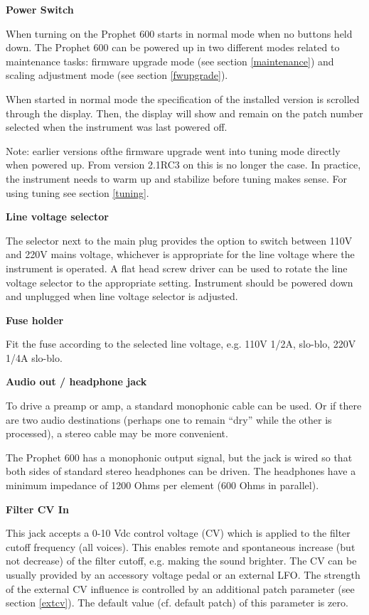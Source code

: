 \textbf{Power Switch}

When turning on the Prophet 600 starts in normal mode when no buttons held down. The Prophet 600 can be powered up in two different modes related to maintenance tasks: firmware upgrade mode (see section \ref{maintenance}) and scaling adjustment mode (see section \ref{fwupgrade}).  

When started in normal mode the specification of the installed version is scrolled through the display. Then, the display will show and remain on the patch number selected when the instrument was last powered off.

Note: earlier versions ofthe firmware upgrade went into tuning mode directly when powered up. From version 2.1RC3 on this is no longer the case. In practice, the instrument needs to warm up and stabilize before tuning makes sense. For using tuning see section \ref{tuning}.

\textbf{Line voltage selector}

The selector next to the main plug provides the option to switch between 110V and 220V mains voltage, whichever is appropriate for the line voltage where the instrument is operated. A flat head screw driver can be used to rotate the line voltage selector to the appropriate setting. Instrument should be powered down and unplugged when line voltage selector is adjusted.

\textbf{Fuse holder}

Fit the fuse according to the selected line voltage, e.g. 110V 1/2A, slo-blo, 220V 1/4A slo-blo.

\textbf{Audio out / headphone jack}

To drive a preamp or amp, a standard monophonic cable can be used. Or if there are two audio destinations (perhaps one to remain “dry” while the other is processed), a stereo cable may be more convenient.

The Prophet 600 has a monophonic output signal, but the jack is wired so that both sides of standard stereo headphones can be driven. The headphones have a minimum impedance of 1200 Ohms per element (600 Ohms in parallel).

\textbf{Filter CV In}

This jack accepts a 0-10 Vdc control voltage (CV) which is applied to the filter cutoff frequency (all voices). This enables remote and spontaneous increase (but not decrease) of the filter cutoff, e.g. making the sound brighter. The CV can be usually provided by an accessory voltage pedal or an external LFO. The strength of the external CV influence is controlled by an additional patch parameter (see section \ref{extcv}). The default value (cf. default patch) of this parameter is zero. 

